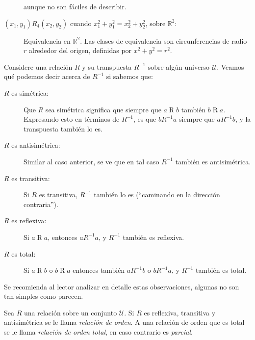 \begin{example}
\begin{description}
      aunque no son fáciles de describir.
    \item[\boldmath \((x_1, y_1) \mathrel{R_4} (x_2, y_2)\)
	  cuando \(x_1^2 + y_1^2 = x_2^2 + y_2^2\),
	  sobre \(\mathbb{R}^2\):\unboldmath]
      Equivalencia en \(\mathbb{R}^2\).
      Las clases de equivalencia son circunferencias de radio \(r\)
      alrededor del origen,
      definidas por \(x^2 + y^2 = r^2\).
    \end{description}
    Considere una relación \(R\) y su transpuesta \(R^{-1}\)
    sobre algún universo \(\mathcal{U}\).
    Veamos qué podemos decir acerca de \(R^{-1}\)
    si sabemos que:
    \begin{description}
    \item[\boldmath \(R\) es simétrica:\unboldmath]
      Que \(R\) sea simétrica significa
      que siempre que \(a \mathrel{R} b\) también \(b \mathrel{R} a\).
      Expresando esto en términos de \(R^{-1}\),
      es que \(b \mathrel{R^{-1}} a\) siempre que \(a \mathrel{R^{-1}} b\),
      y la transpuesta también lo es.
    \item[\boldmath \(R\) es antisimétrica:\unboldmath]
      Similar al caso anterior,
      se ve que en tal caso \(R^{-1}\) también es antisimétrica.
    \item[\boldmath \(R\) es transitiva:\unboldmath]
      Si \(R\) es transitiva,
      \(R^{-1}\) también lo es
      (``caminando en la dirección contraria'').
    \item[\boldmath \(R\) es reflexiva:\unboldmath]
      Si \(a \mathrel{R} a\),
      entonces \(a \mathrel{R^{-1}} a\),
      y \(R^{-1}\) también es reflexiva.
    \item[\boldmath \(R\) es total:\unboldmath]
      Si \(a \mathrel{R} b\) o \(b \mathrel{R} a\)
      entonces también \(a \mathrel{R^{-1}} b\) o \(b \mathrel{R^{-1}} a\),
      y \(R^{-1}\) también es total.
    \end{description}
    Se recomienda al lector analizar en detalle estas observaciones,
    algunas no son tan simples como parecen.
  \end{example}
  \begin{definition}
    Sea \(R\) una relación sobre un conjunto \(\mathcal{U}\).
    Si \(R\) es reflexiva, transitiva y antisimétrica
    se le llama \emph{relación de orden}.
    A una relación de orden que es total
    se le llama \emph{relación de orden total},
    en caso contrario es \emph{parcial}.
  \end{definition}

